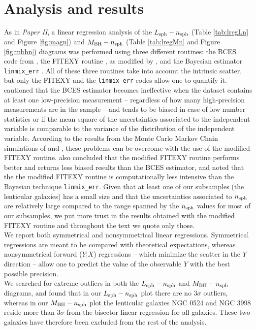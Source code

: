\documentclass[preprint2]{emulateapj}
\begin{document}


\section{Analysis and results}
\label{sec:anal}
As in \emph{Paper II}, a linear regression analysis of the $L_{\rm sph} - n_{\rm sph}$ 
(Table \ref{tab:lregLn} and Figure \ref{fig:magn})
and $M_{\rm BH} - n_{\rm sph}$ (Table \ref{tab:lregMn} and Figure \ref{fig:mbhn}) diagrams 
was performed using three different routines: 
the BCES code from \cite{akritasbershady1996}, 
the FITEXY routine \citep{press1992}, as modified by \cite{tremaine2002}, 
and the Bayesian estimator {\tt linmix\_err} \citep{linmixerr}.
All of these three routines take into account the intrinsic scatter, 
but only the FITEXY and the {\tt linmix\_err} codes allow one to quantify it.
\cite{tremaine2002} cautioned that 
the BCES estimator becomes ineffective when the dataset contains at least one low-precision measurement -- 
regardless of how many high-precision measurements are in the sample -- 
and tends to be biased in case of low number statistics 
or if the mean square of the uncertainties associated to the independent variable is comparable to 
the variance of the distribution of the independent variable. 
According to the results from the Monte Carlo Markov Chain simulations of \cite{tremaine2002} and \cite{novak2006}, 
these problems can be overcome with the use of the modified FITEXY routine. 
\cite{park2012} also concluded that the modified FITEXY routine performs better and returns less biased results than the BCES estimator, 
and noted that the the modified FITEXY routine is computationally less intensive than the Bayesian technique {\tt linmix\_err}. 
Given that at least one of our subsamples (the lenticular galaxies) has a small size 
and that the uncertainties associated to $n_{\rm sph}$ are relatively large 
compared to the range spanned by the $n_{\rm sph}$ values for most of our subsamples, 
we put more trust in the results obtained with the modified FITEXY routine 
and throughout the text we quote only those. \\ 
We report both symmetrical and nonsymmetrical linear regressions.  
Symmetrical regressions are meant to be compared with theoretical expectations, 
whereas nonsymmetrical forward ($Y|X$) regressions -- which minimize the scatter in the $Y$ direction -- 
allow one to predict the value of the observable $Y$ with the best possible precision. \\
We searched for extreme outliers in both the $L_{\rm sph} - n_{\rm sph}$ and $M_{\rm BH} - n_{\rm sph}$ diagrams, 
and found that in our $L_{\rm sph} - n_{\rm sph}$ plot there are no $3\sigma$ outliers, 
whereas in our $M_{\rm BH} - n_{\rm sph}$ plot 
the lenticular galaxies NGC 0524 and NGC 3998 reside more than $3\sigma$ from the bisector linear regression for all galaxies. 
These two galaxies have therefore been excluded from the rest of the analysis. 
\end{document}
